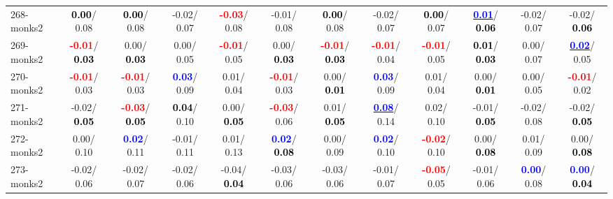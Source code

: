 \begin{table}[h]
\begin{center}
{\begin{tabular}{lc|c|c|c|c|c|c|c|c|c|c}
268-monks2 & \textcolor{black}{\textbf{  0.00}}/  0.08 & \textcolor{black}{\textbf{  0.00}}/  0.08 &  -0.02/  0.07 & \textcolor{red}{\textbf{ -0.03}}/  0.08 &  -0.01/  0.08 & \textcolor{black}{\textbf{  0.00}}/  0.08 &  -0.02/  0.07 & \textcolor{black}{\textbf{  0.00}}/  0.07 & \underline{\textcolor{blue}{\textbf{  0.01}}}/\textcolor{black}{\textbf{  0.06}} &  -0.02/  0.07 &  -0.02/\textcolor{black}{\textbf{  0.06}} \\
269-monks2 & \textcolor{red}{\textbf{ -0.01}}/\textcolor{black}{\textbf{  0.03}} &   0.00/\textcolor{black}{\textbf{  0.03}} &   0.00/  0.05 & \textcolor{red}{\textbf{ -0.01}}/  0.05 &   0.00/\textcolor{black}{\textbf{  0.03}} & \textcolor{red}{\textbf{ -0.01}}/\textcolor{black}{\textbf{  0.03}} & \textcolor{red}{\textbf{ -0.01}}/  0.04 & \textcolor{red}{\textbf{ -0.01}}/  0.05 & \textcolor{black}{\textbf{  0.01}}/\textcolor{black}{\textbf{  0.03}} &   0.00/  0.07 & \underline{\textcolor{blue}{\textbf{  0.02}}}/  0.05 \\
270-monks2 & \textcolor{red}{\textbf{ -0.01}}/  0.03 & \textcolor{red}{\textbf{ -0.01}}/  0.03 & \textcolor{blue}{\textbf{  0.03}}/  0.09 &   0.01/  0.04 & \textcolor{red}{\textbf{ -0.01}}/  0.03 &   0.00/\textcolor{black}{\textbf{  0.01}} & \textcolor{blue}{\textbf{  0.03}}/  0.09 &   0.01/  0.04 &   0.00/\textcolor{black}{\textbf{  0.01}} &   0.00/  0.05 & \textcolor{red}{\textbf{ -0.01}}/  0.02 \\ \hline
271-monks2 &  -0.02/\textcolor{black}{\textbf{  0.05}} & \textcolor{red}{\textbf{ -0.03}}/\textcolor{black}{\textbf{  0.05}} & \textcolor{black}{\textbf{  0.04}}/  0.10 &   0.00/\textcolor{black}{\textbf{  0.05}} & \textcolor{red}{\textbf{ -0.03}}/  0.06 &   0.01/\textcolor{black}{\textbf{  0.05}} & \underline{\textcolor{blue}{\textbf{  0.08}}}/  0.14 &   0.02/  0.10 &  -0.01/\textcolor{black}{\textbf{  0.05}} &  -0.02/  0.08 &  -0.02/\textcolor{black}{\textbf{  0.05}} \\
272-monks2 &   0.00/  0.10 & \textcolor{blue}{\textbf{  0.02}}/  0.11 &  -0.01/  0.11 &   0.01/  0.13 & \textcolor{blue}{\textbf{  0.02}}/\textcolor{black}{\textbf{  0.08}} &   0.00/  0.09 & \textcolor{blue}{\textbf{  0.02}}/  0.10 & \textcolor{red}{\textbf{ -0.02}}/  0.10 &   0.00/\textcolor{black}{\textbf{  0.08}} &   0.01/  0.09 &   0.00/\textcolor{black}{\textbf{  0.08}} \\
273-monks2 &  -0.02/  0.06 &  -0.02/  0.07 &  -0.02/  0.06 &  -0.04/\textcolor{black}{\textbf{  0.04}} &  -0.03/  0.06 &  -0.03/  0.06 &  -0.01/  0.07 & \textcolor{red}{\textbf{ -0.05}}/  0.05 &  -0.01/  0.06 & \textcolor{blue}{\textbf{  0.00}}/  0.08 & \textcolor{blue}{\textbf{  0.00}}/\textcolor{black}{\textbf{  0.04}} \\

\end{tabular}}
\end{center}
\end{table}
